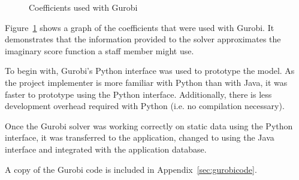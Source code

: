 
\begin{figure}
  \begin{center}
  \end{center}
  \caption{Coefficients used with Gurobi}
  \label{gurobi_coeff}
\end{figure}

Figure~\ref{gurobi_coeff} shows a graph of the coefficients that were used
with Gurobi. It demonstrates that the information provided to the solver
approximates the imaginary score function a staff member might use.

To begin with, Gurobi's Python interface was used to prototype the model. As
the project implementer is more familiar with Python than with Java, it was
faster to prototype using the Python interface. Additionally, there is less
development overhead required with Python (i.e. no compilation necessary).

Once the Gurobi solver was working correctly on static data using the Python
interface, it was transferred to the application, changed to using the Java
interface and integrated with the application database.

A copy of the Gurobi code is included in Appendix~\ref{sec:gurobicode}.
